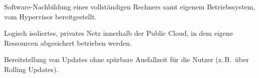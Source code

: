 \begin{glossar}
  \item[Virtuelle Maschine (VM)] Software-Nachbildung eines vollständigen
        Rechners samt eigenem Betriebssystem, vom Hypervisor bereitgestellt.

  \item[VPC (Virtual Private Cloud)] Logisch isoliertes, privates Netz innerhalb
        der Public Cloud, in dem eigene Ressourcen abgesichert betrieben werden.

  \item[Zero Downtime] Bereitstellung von Updates ohne spürbare Ausfallzeit
        für die Nutzer (z.\,B.\ über Rolling Updates).

\end{glossar}

